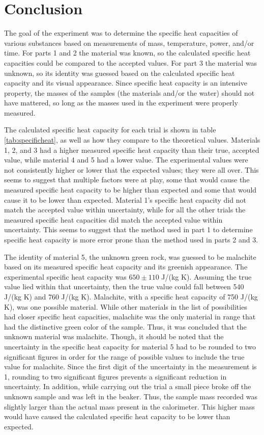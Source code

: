 \documentclass[12pt]{iopart} %
\begin{document}
\section{Conclusion}

The goal of the experiment was to determine the specific heat capacities of various substances based on measurements of mass, temperature, power, and/or time.
For parts 1 and 2 the material was known, so the calculated specific heat capacities could be compared to the accepted values.
For part 3 the material was unknown, so its identity was guessed based on the calculated specific heat capacity and its visual appearance.
Since specific heat capacity is an intensive property, the masses of the samples (the materials and/or the water) should not have mattered, so long as the masses used in the experiment were properly measured.

The calculated specific heat capacity for each trial is shown in table \ref{tab:specificheat}, as well as how they compare to the theoretical values.
Materials 1, 2, and 3 had a higher measured specific heat capacity than their true, accepted value, while material 4 and 5 had a lower value.
The experimental values were not consistently higher or lower that the expected values; they were all over.
This seems to suggest that multiple factors were at play, some that would cause the measured specific heat capacity to be higher than expected and some that would cause it to be lower than expected.
Material 1's specific heat capacity did not match the accepted value within uncertainty, while for all the other trials the measured specific heat capacities did match the accepted value within uncertainty.
This seems to suggest that the method used in part 1 to determine specific heat capacity is more error prone than the method used in parts 2 and 3.

The identity of material 5, the unknown green rock, was guessed to be malachite based on its measured specific heat capacity and its greenish appearance.
The experimental specific heat capacity was $650 \pm 110$ J/(kg K).
Assuming the true value lied within that uncertainty, then the true value could fall between 540 J/(kg K) and 760 J/(kg K).
Malachite, with a specific heat capacity of 750 J/(kg K), was one possible material.
While other materials in the list of possibilities had closer specific heat capacities, malachite was the only material in range that had the distinctive green color of the sample.
Thus, it was concluded that the unknown material was malachite.
Though, it should be noted that the uncertainty in the specific heat capacity for material 5 had to be rounded to two significant figures in order for the range of possible values to include the true value for malachite.
Since the first digit of the uncertainty in the measurement is 1, rounding to two significant figures prevents a significant reduction in uncertainty.
In addition, while carrying out the trial a small piece broke off the unknown sample and was left in the beaker.
Thus, the sample mass recorded was slightly larger than the actual mass present in the calorimeter.
This higher mass would have caused the calculated specific heat capacity to be lower than expected.
\end{document}
